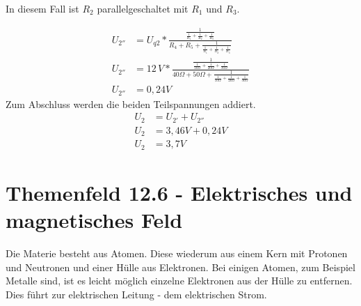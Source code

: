\documentclass[a4paper,10pt]{scrreprt}
\begin{document}
In diesem Fall ist $R_2$ parallelgeschaltet mit $R_1$ und $R_3$.

\begin{align}
  U_{2''} &= U_{q2}*\frac{\frac{1}{\frac{1}{R_1}+\frac{1}{R_2}+\frac{1}{R_3}}}{R_4 + R_5 + \frac{1}{\frac{1}{R_1}+\frac{1}{R_2}+\frac{1}{R_3}}}\\
  U_{2''} &= 12\,V*\frac{\frac{1}{\frac{1}{10\Omega}+\frac{1}{20\Omega}+\frac{1}{30\Omega}}}{40\Omega + 50\Omega + \frac{1}{\frac{1}{10\Omega}+\frac{1}{20\Omega}+\frac{1}{30\Omega}}}\\
  U_{2''} &= 0,24V
\end{align}
Zum Abschluss werden die beiden Teilspannungen addiert.
\begin{align}
  U_2 &= U_{2'} + U_{2''}\\
  U_2 &= 3,46V + 0,24V\\
  U_2 &= 3,7V
\end{align}

%
%

\chapter{Themenfeld 12.6 - Elektrisches und magnetisches Feld}
Die Materie besteht aus Atomen. Diese wiederum aus einem Kern mit Protonen und Neutronen und einer Hülle aus Elektronen. Bei einigen Atomen, zum Beispiel Metalle sind, ist es leicht möglich einzelne Elektronen aus der Hülle zu entfernen. Dies führt zur elektrischen Leitung - dem elektrischen Strom.
\end{document}
